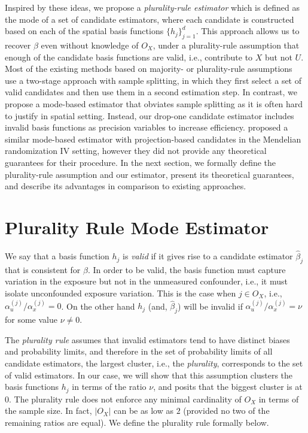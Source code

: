 \documentclass[
  12pt]{article}
\begin{document}
Inspired by these ideas, we propose a \textit{plurality-rule estimator} which is defined as the mode of a set of candidate estimators, where each candidate is constructed based on each of the spatial basis functions $\{h_j\}_{j=1}^d$. This approach allows us to recover $\beta$ even without knowledge of $O_{X}$, under a plurality-rule assumption that enough of the candidate basis functions are valid, i.e., contribute to $X$ but not $U$. Most of the existing methods based on majority- or plurality-rule assumptions use a two-stage approach with sample splitting, in which they first select a set of valid candidates and then use them in a second estimation step. In contrast, we propose a mode-based estimator that obviates sample splitting as it is often hard to justify in spatial setting. Instead, our drop-one candidate estimator includes invalid basis functions as precision variables to increase efficiency.  \cite{hartwig2017robust} proposed a similar mode-based estimator with projection-based candidates in the Mendelian randomization IV setting, however they did not provide any theoretical guarantees for their procedure.
In the next section, we formally define the plurality-rule assumption and our estimator, present its theoretical guarantees, and describe its advantages in comparison to existing approaches.

\section{Plurality Rule Mode Estimator}\label{sec:plurality-estimator}

We say that a basis function $h_j$ is \textit{valid} if it gives rise to a candidate estimator $\hat \beta_j$ that is consistent for $\beta$. In order to be valid, the basis function must capture variation in the exposure but not in the unmeasured confounder,  i.e., it must isolate unconfounded exposure variation. This is the case when 
$j \in O_X$, i.e.,  $\alpha_u^{(j)}/\alpha_x^{(j)}=0$. On the other hand $h_j$ (and, $\hat \beta_j$) will be invalid if $\alpha_u^{(j)}/\alpha_x^{(j)}=\nu$ for some value $\nu \neq 0$. 

The \textit{plurality rule} assumes that invalid estimators tend to have distinct biases and probability limits, and therefore in the set of probability limits of all candidate estimators, the largest cluster, i.e., the \textit{plurality}, corresponds to the set of valid estimators. In our case, we will show that this assumption clusters the basis functions $h_j$ in terms of the ratio $\nu$, and posits that the biggest cluster is at $0$. The plurality rule does not enforce any minimal cardinality of $O_X$ in terms of the sample size. In fact, $|O_X|$ can be as low as $2$ (provided no two of the remaining ratios are equal).  We define the plurality rule formally below. 
\end{document}
